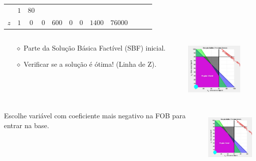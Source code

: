 \begin{frame}
{\begin{table}
\begin{tabular}{c c c c c c c c c c c c}
				& \cellcolor{yellow!60}  $ \scriptstyle 1$ 
				& \cellcolor{yellow!60}  $ \scriptstyle 80$ \\
				\cellcolor{blue!80} \color{white} $ \scriptstyle z$
				& \cellcolor{yellow!60}  $ \scriptstyle 1$
				& \cellcolor{yellow!60}  $ \scriptstyle 0$ 
				& \cellcolor{yellow!60}  $ \scriptstyle 0$
				& \cellcolor{yellow!60}  $ \scriptstyle 600$
				& \cellcolor{yellow!60}  $ \scriptstyle 0$
				& \cellcolor{yellow!60}  $ \scriptstyle 0$
				& \cellcolor{yellow!60}  $ \scriptstyle 1400$ 
				& \cellcolor{yellow!60}  $ \scriptstyle 76000$ \\
			\end{tabular}
		\end{table}	
	}	
	{
	\begin{columns}
		\begin{column}{0.5\textwidth}
			\centering
			\begin{mdframed}[backgroundcolor=orange!80]
				\begin{itemize}
				\item[$\diamond$] Parte da Solução Básica Factível (SBF) inicial.
				\item[$\diamond$] Verificar se a solução é ótima! (Linha de Z).
				\end{itemize}
			\end{mdframed}
		\end{column}
		\begin{column}{0.5\textwidth}
			\centering
			\includegraphics[width=2.8cm,height=2.8cm]{Exaustiva_2.jpeg}
		\end{column}
	\end{columns}
	}
	\only<2>
	{
	\begin{columns}
		\begin{column}{0.5\textwidth}
			\centering
			\begin{mdframed}[backgroundcolor=olive!80]
				Escolhe variável com coeficiente mais negativo na FOB para entrar na base.
			\end{mdframed}
		\end{column}
		\begin{column}{0.5\textwidth}
			\centering
			\includegraphics[width=2.8cm,height=2.8cm]{Exaustiva_2.jpeg}

\end{column}
\end{columns}}
\end{frame}
